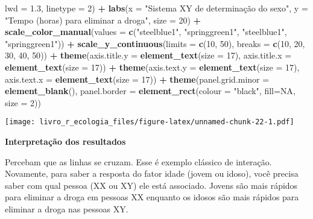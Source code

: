 \documentclass[
]{book}
\newenvironment{Shaded}{\begin{snugshade}}{\end{snugshade}}
\newcommand{\DataTypeTok}[1]{\textcolor[rgb]{0.13,0.29,0.53}{#1}}
\newcommand{\DecValTok}[1]{\textcolor[rgb]{0.00,0.00,0.81}{#1}}
\newcommand{\FloatTok}[1]{\textcolor[rgb]{0.00,0.00,0.81}{#1}}
\newcommand{\KeywordTok}[1]{\textcolor[rgb]{0.13,0.29,0.53}{\textbf{#1}}}
\newcommand{\NormalTok}[1]{#1}
\newcommand{\OperatorTok}[1]{\textcolor[rgb]{0.81,0.36,0.00}{\textbf{#1}}}
\newcommand{\OtherTok}[1]{\textcolor[rgb]{0.56,0.35,0.01}{#1}}
\newcommand{\StringTok}[1]{\textcolor[rgb]{0.31,0.60,0.02}{#1}}
\begin{document}
\begin{Shaded}
\begin{Highlighting}[]
            \DataTypeTok{lwd  =} \FloatTok{1.3}\NormalTok{, }\DataTypeTok{linetype =} \DecValTok{2}\NormalTok{) }\OperatorTok{+}\StringTok{ }
\StringTok{  }\KeywordTok{labs}\NormalTok{(}\DataTypeTok{x =} \StringTok{"Sistema XY de determinação do sexo"}\NormalTok{, }\DataTypeTok{y =} \StringTok{"Tempo (horas) para eliminar a droga"}\NormalTok{, }
       \DataTypeTok{size =} \DecValTok{20}\NormalTok{) }\OperatorTok{+}
\StringTok{  }\KeywordTok{scale_color_manual}\NormalTok{(}\DataTypeTok{values =} \KeywordTok{c}\NormalTok{(}\StringTok{"steelblue1"}\NormalTok{, }\StringTok{"springgreen1"}\NormalTok{, }\StringTok{"steelblue1"}\NormalTok{, }\StringTok{"springgreen1"}\NormalTok{)) }\OperatorTok{+}
\StringTok{  }\KeywordTok{scale_y_continuous}\NormalTok{(}\DataTypeTok{limits =} \KeywordTok{c}\NormalTok{(}\DecValTok{10}\NormalTok{, }\DecValTok{50}\NormalTok{), }\DataTypeTok{breaks =} \KeywordTok{c}\NormalTok{(}\DecValTok{10}\NormalTok{, }\DecValTok{20}\NormalTok{, }\DecValTok{30}\NormalTok{, }\DecValTok{40}\NormalTok{, }\DecValTok{50}\NormalTok{)) }\OperatorTok{+}
\StringTok{  }\KeywordTok{theme}\NormalTok{(}\DataTypeTok{axis.title.y =} \KeywordTok{element_text}\NormalTok{(}\DataTypeTok{size =} \DecValTok{17}\NormalTok{), }\DataTypeTok{axis.title.x =} \KeywordTok{element_text}\NormalTok{(}\DataTypeTok{size =} \DecValTok{17}\NormalTok{)) }\OperatorTok{+}
\StringTok{  }\KeywordTok{theme}\NormalTok{(}\DataTypeTok{axis.text.y =} \KeywordTok{element_text}\NormalTok{(}\DataTypeTok{size =} \DecValTok{17}\NormalTok{), }\DataTypeTok{axis.text.x =} \KeywordTok{element_text}\NormalTok{(}\DataTypeTok{size =} \DecValTok{17}\NormalTok{)) }\OperatorTok{+}
\StringTok{  }\KeywordTok{theme}\NormalTok{(}\DataTypeTok{panel.grid.minor =} \KeywordTok{element_blank}\NormalTok{(), }
        \DataTypeTok{panel.border =} \KeywordTok{element_rect}\NormalTok{(}\DataTypeTok{colour =} \StringTok{"black"}\NormalTok{, }\DataTypeTok{fill=}\OtherTok{NA}\NormalTok{, }\DataTypeTok{size =} \DecValTok{2}\NormalTok{))}
\end{Highlighting}
\end{Shaded}

\texttt{[image: livro\_r\_ecologia\_files/figure-latex/unnamed-chunk-22-1.pdf]}

\textbf{Interpretação dos resultados}

Percebam que as linhas se cruzam. Esse é exemplo clássico de interação. Novamente, para saber a resposta do fator idade (jovem ou idoso), você precisa saber com qual pessoa (XX ou XY) ele está associado. Jovens são mais rápidos para eliminar a droga em pessoas XX enquanto os idosos são mais rápidos para eliminar a droga nas pessoas XY.
\end{document}
